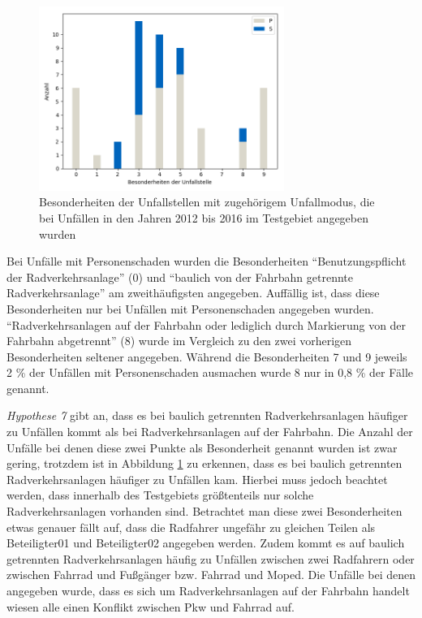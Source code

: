 \begin{savenotes}
	\begin{figure}[H]
		\centering
		\includegraphics[width=8cm,height=6cm]{figures/BES}
		\caption[Besonderheiten der Unfallstelle mit zugehörigem Unfallmodus, die bei Unfällen in den Jahren 2012 bis 2016 im Testgebiet angegeben wurden]{Besonderheiten der Unfallstellen mit zugehörigem Unfallmodus, die bei Unfällen in den Jahren 2012 bis 2016 im Testgebiet angegeben wurden}\label{fig:BES}
	\end{figure}
\end{savenotes}

Bei Unfälle mit Personenschaden wurden die Besonderheiten \enquote{Benutzungspflicht der Radverkehrsanlage} (0) und \enquote{baulich von der Fahrbahn getrennte Radverkehrsanlage} am zweithäufigsten angegeben. Auffällig ist, dass diese Besonderheiten nur bei Unfällen mit Personenschaden angegeben wurden. \enquote{Radverkehrsanlagen auf der Fahrbahn oder lediglich durch Markierung von der Fahrbahn abgetrennt} (8) wurde im Vergleich zu den zwei vorherigen Besonderheiten seltener angegeben. Während die Besonderheiten 7 und 9 jeweils 2 \% der Unfällen mit Personenschaden ausmachen wurde 8 nur in 0,8 \% der Fälle genannt.

\textit{Hypothese 7} gibt an, dass es bei baulich getrennten Radverkehrsanlagen häufiger zu Unfällen kommt als bei Radverkehrsanlagen auf der Fahrbahn. Die Anzahl der Unfälle bei denen diese zwei Punkte als Besonderheit genannt wurden ist zwar gering, trotzdem ist in Abbildung \ref{fig:BES} zu erkennen, dass es bei baulich getrennten Radverkehrsanlagen häufiger zu Unfällen  kam. Hierbei muss jedoch beachtet werden, dass innerhalb des Testgebiets größtenteils nur solche Radverkehrsanlagen vorhanden sind. Betrachtet man diese zwei Besonderheiten etwas genauer fällt auf, dass die Radfahrer ungefähr zu gleichen Teilen als Beteiligter01 und Beteiligter02 angegeben werden. Zudem kommt es auf baulich getrennten Radverkehrsanlagen häufig zu Unfällen zwischen zwei Radfahrern oder zwischen Fahrrad und Fußgänger bzw. Fahrrad und Moped. Die Unfälle bei denen angegeben wurde, dass es sich um Radverkehrsanlagen auf der Fahrbahn handelt wiesen alle einen Konflikt zwischen Pkw und Fahrrad auf.

